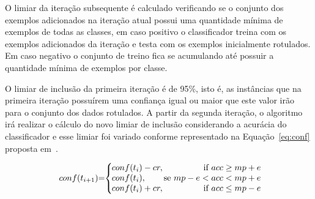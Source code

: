    O limiar da iteração subsequente é calculado verificando se o conjunto dos exemplos adicionados na iteração atual possui uma quantidade mínima de exemplos de todas as classes, em caso positivo o classificador treina com os exemplos adicionados da iteração e testa com os exemplos inicialmente rotulados. Em caso negativo o conjunto de treino fica se acumulando até possuir a quantidade mínima de exemplos por classe.

    O limiar de inclusão da primeira iteração é de 95\%, isto é, as instâncias que na primeira iteração possuírem uma confiança igual ou maior que este valor irão para o conjunto dos dados rotulados. A partir da segunda iteração, o algoritmo irá realizar o cálculo do novo limiar de inclusão considerando a acurácia do classificador e esse limiar foi variado conforme representado na Equação~\ref{eq:conf} proposta em~\cite{vale2018selftraining}.

    \begin{equation}
        \label{eq:conf}
    	\hspace{-0.2cm} conf(t_{i+1}) \hspace{-0.1cm}= \hspace{-0.1cm}
    	\left \{
    	\begin{array}{lr}
    	\hspace{-0.2cm}conf(t_i) - cr, & \hspace{-0.8cm}\text{if } acc \geq mp + e \\
    	\hspace{-0.2cm}conf(t_i), & \hspace{-0.3cm} \text{se } mp - e < acc < mp + e \\
    	\hspace{-0.2cm}conf(t_i) + cr, & \hspace{-0.8cm}\text{if } acc \leq mp - e \\
    	\end{array}
    	\right.
    	\hspace{-0.5cm}
	\end{equation}

